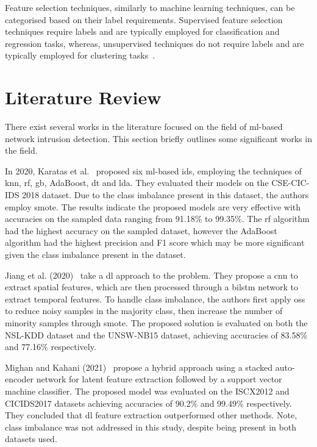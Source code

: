 Feature selection techniques, similarly to machine learning techniques, can be
categorised based on their label requirements. Supervised feature selection
techniques require labels and are typically employed for classification and
regression tasks, whereas, unsupervised techniques do not require labels and
are typically employed for clustering tasks~\cite{feat-sel}.

\section{Literature Review}%
\label{sec:literature}

There exist several works in the literature focused on the field of
\gls{ml}-based network intrusion detection. This section briefly outlines some
significant works in the field.

In 2020, Karatas et al.~\cite{Karatas} proposed six \gls{ml}-based \gls{ids},
employing the techniques of \gls{knn}, \gls{rf}, \gls{gb}, AdaBoost, \gls{dt}
and \gls{lda}. They evaluated their models on the CSE-CIC-IDS 2018 dataset. Due
to the class imbalance present in this dataset, the authors employ \gls{smote}.
The results indicate the proposed models are very effective with accuracies on
the sampled data ranging from 91.18\% to 99.35\%. The \gls{rf} algorithm had
the highest accuracy on the sampled dataset, however the AdaBoost algorithm had
the highest precision and F1 score which may be more significant given the
class imbalance present in the dataset.

Jiang et al. (2020)~\cite{Jiang} take a \gls{dl} approach to the problem. They
propose a \gls{cnn} to extract spatial features, which are then processed
through a \gls{bilstm} network to extract temporal features. To handle class
imbalance, the authors first apply \gls{oss} to reduce noisy samples in the
majority class, then increase the number of minority samples through
\gls{smote}. The proposed solution is evaluated on both the NSL-KDD dataset and
the UNSW-NB15 dataset, achieving accuracies of 83.58\% and 77.16\%
respectively.

Mighan and Kahani (2021)~\cite{Mighan} propose a hybrid approach using a
stacked auto-encoder network for latent feature extraction followed by a
support vector machine classifier. The proposed model was evaluated on the
ISCX2012 and CICIDS2017 datasets achieving accuracies of 90.2\% and 99.49\%
respectively. They concluded that \gls{dl} feature extraction outperformed
other methods. Note, class imbalance was not addressed in this study, despite
being present in both datasets used.

